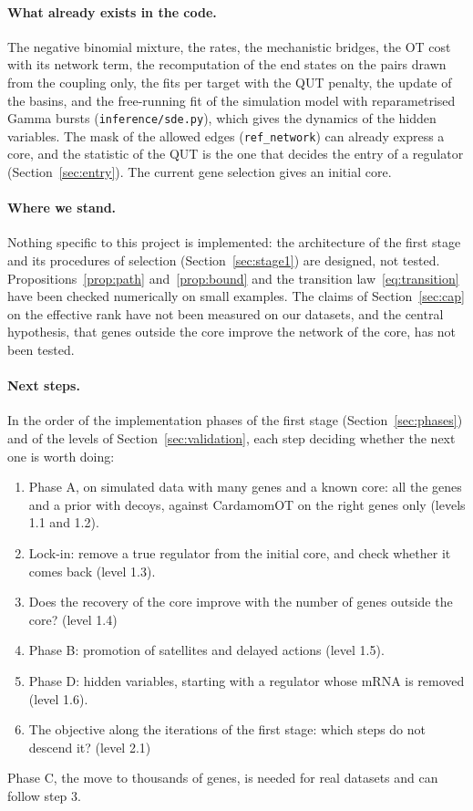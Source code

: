 \documentclass[a4paper, 11pt]{article}
\theoremstyle{plain}
\theoremstyle{remark}
\begin{document}
\paragraph{What already exists in the code.} The negative binomial mixture, the rates, the mechanistic bridges, the OT cost with its network term, the recomputation of the end states on the pairs drawn from the coupling only, the fits per target with the QUT penalty, the update of the basins, and the free-running fit of the simulation model with reparametrised Gamma bursts (\texttt{inference/sde.py}), which gives the dynamics of the hidden variables. The mask of the allowed edges (\texttt{ref\_network}) can already express a core, and the statistic of the QUT is the one that decides the entry of a regulator (Section~\ref{sec:entry}). The current gene selection gives an initial core.

\paragraph{Where we stand.} Nothing specific to this project is implemented: the architecture of the first stage and its procedures of selection (Section~\ref{sec:stage1}) are designed, not tested. Propositions~\ref{prop:path} and~\ref{prop:bound} and the transition law~\eqref{eq:transition} have been checked numerically on small examples. The claims of Section~\ref{sec:cap} on the effective rank have not been measured on our datasets, and the central hypothesis, that genes outside the core improve the network of the core, has not been tested.

\paragraph{Next steps.} In the order of the implementation phases of the first stage (Section~\ref{sec:phases}) and of the levels of Section~\ref{sec:validation}, each step deciding whether the next one is worth doing:
\begin{enumerate}[nosep]
\item Phase A, on simulated data with many genes and a known core: all the genes and a prior with decoys, against CardamomOT on the right genes only (levels 1.1 and 1.2).
\item Lock-in: remove a true regulator from the initial core, and check whether it comes back (level 1.3).
\item Does the recovery of the core improve with the number of genes outside the core? (level 1.4)
\item Phase B: promotion of satellites and delayed actions (level 1.5).
\item Phase D: hidden variables, starting with a regulator whose mRNA is removed (level 1.6).
\item The objective along the iterations of the first stage: which steps do not descend it? (level 2.1)
\end{enumerate}
Phase C, the move to thousands of genes, is needed for real datasets and can follow step 3.
\end{document}
